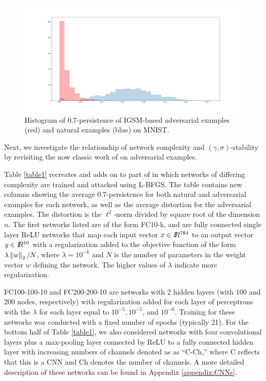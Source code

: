 \begin{figure}[!ht]
\centering
\includegraphics[trim=200 80 100 100, clip,width=.5\textwidth]{c3_figures/original_hist.png}
\caption{Histogram of $0.7$-persistence of IGSM-based adversarial examples (red) and natural examples (blue) on MNIST. %
}

\label{fig:IGSMpersistenceMNIST}
\end{figure}

Next, we investigate the relationship of network complexity and $(\gamma,\sigma)$-stability by revisiting the now classic work of \citet{szegedy2013} on adversarial examples. 

Table \ref{table1} recreates and adds on to part of \cite[Table 1]{szegedy2013} in which networks of differing complexity are trained and attacked using L-BFGS. The table contains new columns showing the average $0.7$-persistence for both natural and adversarial examples for each network, as well as the average distortion for the adversarial examples. The distortion is the $\ell^2$-norm divided by square root of the dimension $n$. The first networks listed are of the form FC10-k, and are fully connected single layer ReLU networks that map each input vector $x \in I\!\!R^{784}$ to an output vector $y \in I\!\!R^{10}$ with a regularization added to the objective function of the form $\lambda\left\Vert w \right\Vert_2/N$, where $\lambda = 10^{-k}$ and $N$ is the number of parameters in the weight vector $w$ defining the network. The higher values of $\lambda$ indicate more regularization.  

FC100-100-10 and FC200-200-10 are networks with 2 hidden layers (with 100 and 200 nodes, respectively) with regularization added for each layer of perceptrons with the $\lambda$ for each layer equal to $10^{-5}, 10^{-5}$, and  $10^{-6}$. Training for these networks was conducted with a fixed number of epochs (typically 21). For the bottom half of Table \ref{table1}, we also considered networks with four convolutional layers plus a max-pooling layer connected by ReLU to a fully connected hidden layer with increasing numbers of channels denoted as as ``C-Ch,'' where C reflects that this is a CNN and Ch denotes the number of channels. A more detailed description of these networks can be found in Appendix \ref{appendix:CNNs}.

